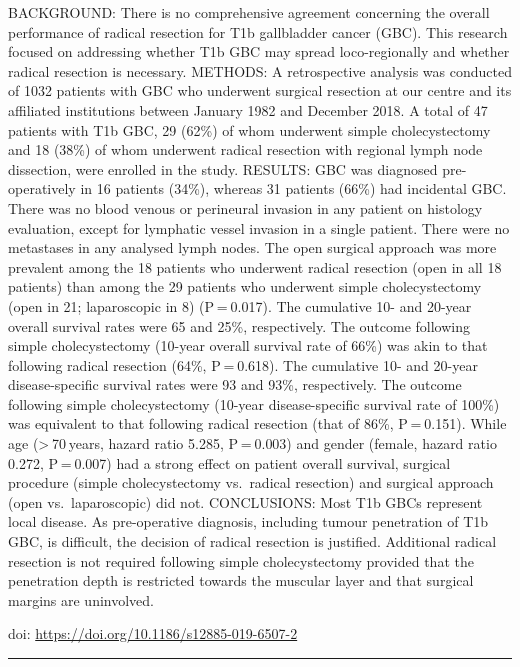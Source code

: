 \documentclass[
]{article}
\begin{document}
BACKGROUND: There is no comprehensive agreement concerning the overall
performance of radical resection for T1b gallbladder cancer (GBC). This
research focused on addressing whether T1b GBC may spread
loco-regionally and whether radical resection is necessary. METHODS: A
retrospective analysis was conducted of 1032 patients with GBC who
underwent surgical resection at our centre and its affiliated
institutions between January 1982 and December 2018. A total of 47
patients with T1b GBC, 29 (62\%) of whom underwent simple
cholecystectomy and 18 (38\%) of whom underwent radical resection with
regional lymph node dissection, were enrolled in the study. RESULTS: GBC
was diagnosed pre-operatively in 16 patients (34\%), whereas 31 patients
(66\%) had incidental GBC. There was no blood venous or perineural
invasion in any patient on histology evaluation, except for lymphatic
vessel invasion in a single patient. There were no metastases in any
analysed lymph nodes. The open surgical approach was more prevalent
among the 18 patients who underwent radical resection (open in all 18
patients) than among the 29 patients who underwent simple
cholecystectomy (open in 21; laparoscopic in 8) (P = 0.017). The
cumulative 10- and 20-year overall survival rates were 65 and 25\%,
respectively. The outcome following simple cholecystectomy (10-year
overall survival rate of 66\%) was akin to that following radical
resection (64\%, P = 0.618). The cumulative 10- and 20-year
disease-specific survival rates were 93 and 93\%, respectively. The
outcome following simple cholecystectomy (10-year disease-specific
survival rate of 100\%) was equivalent to that following radical
resection (that of 86\%, P = 0.151). While age (\textgreater{} 70 years,
hazard ratio 5.285, P = 0.003) and gender (female, hazard ratio 0.272,
P = 0.007) had a strong effect on patient overall survival, surgical
procedure (simple cholecystectomy vs.~radical resection) and surgical
approach (open vs.~laparoscopic) did not. CONCLUSIONS: Most T1b GBCs
represent local disease. As pre-operative diagnosis, including tumour
penetration of T1b GBC, is difficult, the decision of radical resection
is justified. Additional radical resection is not required following
simple cholecystectomy provided that the penetration depth is restricted
towards the muscular layer and that surgical margins are uninvolved.

doi: \url{https://doi.org/10.1186/s12885-019-6507-2}

\begin{center}\rule{0.5\linewidth}{0.5pt}\end{center}
\end{document}
